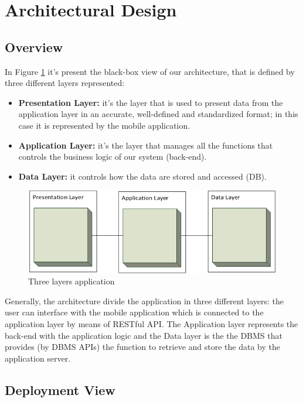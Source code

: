 \section{Architectural Design}
\subsection{Overview}
In Figure \ref{fig:three_layers_application} it's present the black-box view of our architecture, that is defined by three different layers represented:

\begin{itemize}
    \item \textbf{Presentation Layer:} it's the layer that is used to present data from the application layer in an accurate, well-defined and standardized format; in this case it is represented by the mobile application.
    \item \textbf{Application Layer:} it's the layer that manages all the functions that controls the business logic of our system (back-end).
    \item \textbf{Data Layer:} it controls how the data are stored and accessed (DB).
\end{itemize}

\begin{figure}[h!]
        \centering
        \includegraphics[scale=0.6]{images/three_layers.png}
        \caption{Three layers application}
        \label{fig:three_layers_application}
\end{figure}
\FloatBarrier

Generally, the architecture divide the application in three different layers: the user can interface with the mobile application which is connected to the application layer by means of RESTful API. The Application layer represents the back-end with the application logic and the Data layer is the the DBMS that provides (by DBMS APIs) the function to retrieve and store the data by the application server.
\newpage
\subsection{Deployment View}

